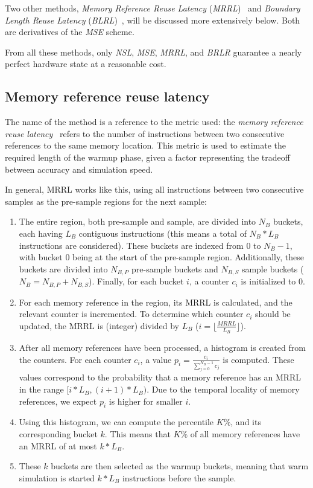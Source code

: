 Two other methods, \textit{Memory Reference Reuse Latency} (\textit{MRRL})~\cite{cpu-mrrl} and \textit{Boundary Length Reuse Latency} (\textit{BLRL})~\cite{blrl}, will be discussed more extensively below.
Both are derivatives of the \textit{MSE} scheme.

From all these methods, only \textit{NSL}, \textit{MSE}, \textit{MRRL}, and \textit{BRLR} guarantee a nearly perfect hardware state at a reasonable cost.

\subsection{Memory reference reuse latency}\label{subsec:mrrl}
The name of the method is a reference to the metric used: the \textit{memory reference reuse latency}~\cite{cpu-mrrl} refers to the number of instructions between two consecutive references to the same memory location.
This metric is used to estimate the required length of the warmup phase, given a factor representing the tradeoff between accuracy and simulation speed.

In general, MRRL works like this, using all instructions between two consecutive samples as the pre-sample regions for the next sample:
\begin{enumerate}
    \item The entire region, both pre-sample and sample, are divided into $N_B$ buckets, each having $L_B$ contiguous instructions (this means a total of $N_B*L_B$ instructions are considered).
    These buckets are indexed from 0 to $N_B - 1$, with bucket 0 being at the start of the pre-sample region.
    Additionally, these buckets are divided into $N_{B,P}$ pre-sample buckets and $N_{B,S}$ sample buckets ($N_B = N_{B,P} + N_{B,S}$).
    Finally, for each bucket $i$, a counter $c_i$ is initialized to 0.
    \item For each memory reference in the region, its MRRL is calculated, and the relevant counter is incremented.
    To determine which counter $c_i$ should be updated, the MRRL is (integer) divided by $L_B$ ($i = \lfloor \frac{MRRL}{L_B} \rfloor$).
    \item After all memory references have been processed, a histogram is created from the counters.
    For each counter $c_i$, a value $p_i = \frac{c_i}{\sum_{j=0}^{N_B-1}{c_j}}$ is computed.
    These values correspond to the probability that a memory reference has an MRRL in the range $[i*L_B, (i+1)*L_B)$.
    Due to the temporal locality of memory references, we expect $p_i$ is higher for smaller $i$.
    \item Using this histogram, we can compute the percentile $K\%$, and its corresponding bucket $k$.
    This means that $K\%$ of all memory references have an MRRL of at most $k*L_B$.
    \item These $k$ buckets are then selected as the warmup buckets, meaning that warm simulation is started $k*L_B$ instructions before the sample.
\end{enumerate}

